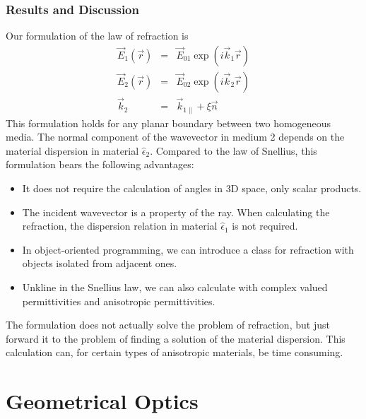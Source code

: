 \documentclass[12pt,a4paper,twoside,openright,BCOR10mm,headsepline,titlepage,abstracton,chapterprefix,final]{scrreprt}
\newcommand\Location{\Vector{r}}
\newcommand\wavenumber{k}
\newcommand\Wavevector{\Vector{\wavenumber}}
\newcommand\Vector[1]{\vec{#1}}
\newcommand\Tensor[1]{\hat{#1}}
\newcommand\scalarEfield{E}
\newcommand\Efield{\Vector{\scalarEfield}}
\newcommand\permittivity{\Tensor{\epsilon}}
\begin{document}
\subsection{Results and Discussion}
Our formulation of the law of refraction is
\begin{eqnarray}
 \Efield_1(\Location) &=& \Efield_{01} \exp(i \Wavevector_1 \Location) \\
 \Efield_2(\Location) &=& \Efield_{02} \exp(i \Wavevector_2 \Location) \\
 \Wavevector_{2} &=& \Wavevector_{1\parallel} + \xi \vec{n}
\end{eqnarray}
This formulation holds for any planar boundary between two homogeneous media. The normal component of the wavevector in medium 2 depends on the material dispersion in material $\permittivity_2$.
Compared to the law of Snellius, this formulation bears the following advantages:
\begin{itemize}
 \item It does not require the calculation of angles in 3D space, only scalar products.
 \item The incident wavevector is a property of the ray. When calculating the refraction, the dispersion relation in material $\permittivity_1$ is not required.
 \item In object-oriented programming, we can introduce a class for refraction with objects isolated from adjacent ones.
 \item Unkline in the Snellius law, we can also calculate with complex valued permittivities and anisotropic permittivities.
\end{itemize}
The formulation does not actually solve the problem of refraction, but just forward it to the problem of finding a solution of the material dispersion. 
This calculation can, for certain types of anisotropic materials, be time consuming.

\chapter{Geometrical Optics}
\end{document}
